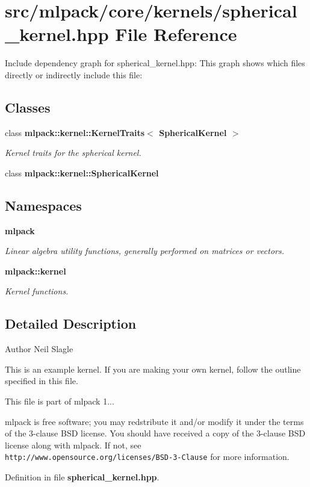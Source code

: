 \section{src/mlpack/core/kernels/spherical\-\_\-kernel.hpp File Reference}
\label{spherical__kernel_8hpp}
Include dependency graph for spherical\-\_\-kernel.\-hpp\-:
This graph shows which files directly or indirectly include this file\-:
\subsection*{Classes}
\begin{DoxyCompactItemize}
\item 
class {\bf mlpack\-::kernel\-::\-Kernel\-Traits$<$ Spherical\-Kernel $>$}
\begin{DoxyCompactList}\small\item\em Kernel traits for the spherical kernel. \end{DoxyCompactList}\item 
class {\bf mlpack\-::kernel\-::\-Spherical\-Kernel}
\end{DoxyCompactItemize}
\subsection*{Namespaces}
\begin{DoxyCompactItemize}
\item 
{\bf mlpack}
\begin{DoxyCompactList}\small\item\em Linear algebra utility functions, generally performed on matrices or vectors. \end{DoxyCompactList}\item 
{\bf mlpack\-::kernel}
\begin{DoxyCompactList}\small\item\em Kernel functions. \end{DoxyCompactList}\end{DoxyCompactItemize}


\subsection{Detailed Description}
\begin{DoxyAuthor}{Author}
Neil Slagle
\end{DoxyAuthor}
This is an example kernel. If you are making your own kernel, follow the outline specified in this file.

This file is part of mlpack 1...

mlpack is free software; you may redstribute it and/or modify it under the terms of the 3-\/clause B\-S\-D license. You should have received a copy of the 3-\/clause B\-S\-D license along with mlpack. If not, see {\tt http\-://www.\-opensource.\-org/licenses/\-B\-S\-D-\/3-\/\-Clause} for more information. 

Definition in file {\bf spherical\-\_\-kernel.\-hpp}.

